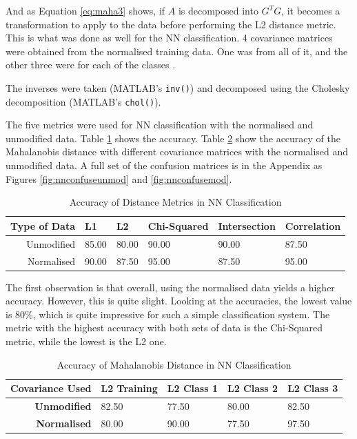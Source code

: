 \documentclass[a4paper, 10pt, conference]{ieeeconf}
\begin{document}
And as Equation \ref{eq:maha3} shows, if $A$ is decomposed into $G^TG$, it becomes a transformation to apply to the data before performing the L2 distance metric. This is what was done as well for the NN classification. 4 covariance matrices were obtained from the normalised training data. One was from all of it, and the other three were for each of the classes \cite{metrics}.

The inverses were taken (MATLAB's \texttt{inv()}) and decomposed using the Cholesky decomposition (MATLAB's \texttt{chol()}).

The five metrics were used for NN classification with the normalised and unmodified data. Table \ref{tbl:nn} shows the accuracy. Table \ref{tbl:nnmaha} show the accuracy of the Mahalanobis distance with different covariance matrices with the normalised and unmodified data. A full set of the confusion matrices is in the Appendix as Figures \ref{fig:nnconfuseunmod} and \ref{fig:nnconfusemod}.

\begin{table}[!ht]
\centering
\caption{Accuracy of Distance Metrics in NN Classification}
\label{tbl:nn}
\begin{tabular}{|r|lllll|}
\hline
\textbf{Type of Data} & \textbf{L1} & \textbf{L2} & \textbf{Chi-Squared} & \textbf{Intersection} & \textbf{Correlation}\\ \hline
Unmodified & 85.00 & 80.00 & 90.00 & 90.00 & 87.50\\
Normalised & 90.00 & 87.50 & 95.00 & 87.50 & 95.00\\ \hline
\end{tabular}
\end{table}

The first observation is that overall, using the normalised data yields a higher accuracy. However, this is quite slight. Looking at the accuracies, the lowest value is 80\%, which is quite impressive for such a simple classification system. The metric with the highest accuracy with both sets of data is the Chi-Squared metric, while the lowest is the L2 one.

\begin{table}[!ht]
\centering
\caption{Accuracy of Mahalanobis Distance in NN Classification}
\label{tbl:nnmaha}
\begin{tabular}{|r|llll|}
\hline
\textbf{Covariance Used} & L2 Training & L2 Class 1 & L2 Class 2 & L2 Class 3\\ \hline
\textbf{Unmodified} & 82.50 & 77.50 & 80.00 & 82.50\\
\textbf{Normalised} & 80.00 & 90.00 & 77.50 & 97.50\\ \hline
\end{tabular}
\end{table}
\end{document}
